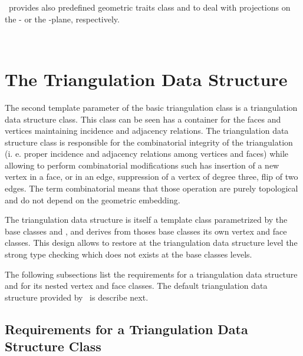 \cgal\ provides also predefined geometric traits class
 and
 to
deal with projections on the
 - or  the -plane,
respectively.

\\

\section{The Triangulation Data Structure}
\label{I1_Sect_Tds}

The second template parameter of the basic triangulation class
 is a triangulation data structure class.
This class can be seen has a container for the 
faces and vertices maintaining incidence and adjacency relations.
The triangulation data structure class 
 is responsible for  the combinatorial integrity of the triangulation
(i. e. proper incidence and adjacency relations among vertices
and faces) while 
allowing  to perform combinatorial modifications
such has 
insertion of a new vertex in a face, or in an edge,
suppression of a vertex of degree three,  flip of two edges.
The term combinatorial means that those operation are purely topological
and do not depend on the geometric embedding.



The triangulation data structure is itself a template class
parametrized by the base classes  and ,
and derives from thoses base classes its own 
vertex and face classes. This design  allows to restore at the 
triangulation data structure
level 
the strong type checking which does not exists at the base classes levels.

The following subsections list the requirements for a triangulation data structure
and for its nested vertex and face classes.
The default triangulation data structure provided by \cgal\ is describe next.


\subsection{Requirements for a Triangulation Data Structure Class}



